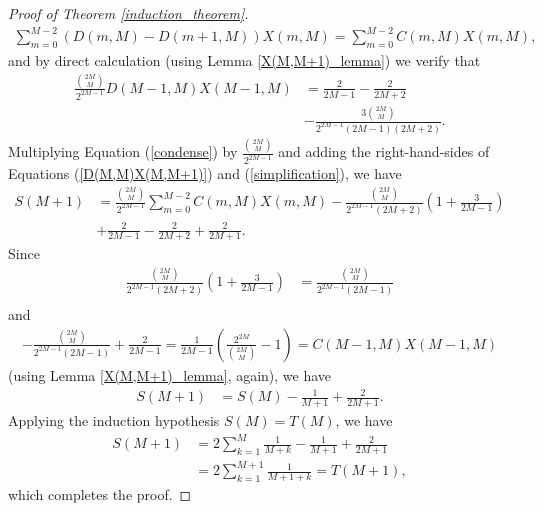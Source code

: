 \documentclass[10pt,a4paper]{amsart}
\begin{document}
\begin{proof}[Proof of Theorem \ref{induction_theorem}]
\begin{align}
\sum_{m=0}^{M-2}\left(D(m,M) - D(m+1,M)\right)X(m,M) = \sum_{m=0}^{M-2}C(m,M)X(m,M),
\end{align}
and by direct calculation (using Lemma \ref{X(M,M+1)_lemma}) we verify that 
\begin{align} \label{simplification}
\frac{\binom{2M}{M}}{2^{2M-1}}D(M-1,M)X(M-1,M) &= \frac{2}{2M-1} - \frac{2}{2M+2} \\
&- \frac{3\binom{2M}{M}}{2^{2M-1}(2M-1)(2M+2)}. \nonumber
\end{align}
Multiplying Equation (\ref{condense}) by $\frac{\binom{2M}{M}}{2^{2M-1}}$ and adding the right-hand-sides of Equations (\ref{D(M,M)X(M,M+1)}) and  (\ref{simplification}), we have
\begin{align*}
S(M+1) &= \frac{\binom{2M}{M}}{2^{2M-1}} \sum_{m=0}^{M-2}C(m,M)X(m,M)  - \frac{\binom{2M}{M}}{2^{2M-1}(2M+2)}\left(1 + \frac{3}{2M-1} \right) \\&+\frac{2}{2M-1} - \frac{2}{2M+2} + \frac{2}{2M+1}.
\end{align*}
Since 
\begin{align*}
\frac{\binom{2M}{M}}{2^{2M-1}(2M+2)}\left(1 + \frac{3}{2M-1} \right) &= \frac{\binom{2M}{M}}{2^{2M-1}(2M-1)}\\
\end{align*}
and
\begin{align*}
-\frac{\binom{2M}{M}}{2^{2M-1}(2M-1)} + \frac{2}{2M-1} = \frac{1}{2M-1} \left(\frac{2^{2M}}{\binom{2M}{M}} -1 \right) = C(M-1,M)X(M-1,M) 
\end{align*}
(using Lemma \ref{X(M,M+1)_lemma}, again), we have
\begin{align*}
S(M+1) &= S(M)  - \frac{1}{M+1} + \frac{2}{2M+1}.
\end{align*}
Applying the induction hypothesis $S(M) = T(M)$, we have
\begin{align*}
S(M+1) &= 2 \sum_{k=1}^M \frac{1}{M+k} - \frac{1}{M+1} + \frac{2}{2M+1} \\
&=2\sum_{k=1}^{M+1} \frac{1}{M+1+k} = T(M+1),
\end{align*}
which completes the proof.
\end{proof}
\end{document}
